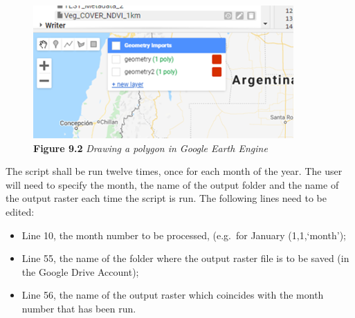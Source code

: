 \documentclass[
  10pt,
  b5paper,
]{book}
\providecommand{\tightlist}{%
  \setlength{\itemsep}{0pt}\setlength{\parskip}{0pt}}
\begin{document}
\begin{figure}
\centering
\includegraphics{images/Figure_9.2.png}
\caption{\textbf{Figure 9.2} \emph{Drawing a polygon in Google Earth Engine}}
\end{figure}

The script shall be run twelve times, once for each month of the year. The user will need to specify the month, the name of the output folder and the name of the output raster each time the script is run. The following lines need to be edited:

\begin{itemize}
\tightlist
\item
  Line 10, the month number to be processed, (e.g.~for January (1,1,`month');
\item
  Line 55, the name of the folder where the output raster file is to be saved (in the Google Drive Account);
\item
  Line 56, the name of the output raster which coincides with the month number that has been run.
\end{itemize}
\end{document}

